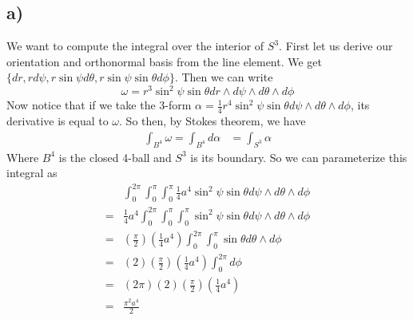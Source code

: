 \documentclass{article}
\theoremstyle{definition}
\begin{document}
\subsection*{a)}
We want to compute the integral over the interior of $S^3$. First let us derive our orientation and orthonormal basis from the 
line element. We get $\{dr, r d\psi, r\sin\psi d\theta, r \sin\psi \sin\theta d\phi\}$. Then we can write 
\[
\omega = r^3\sin^2\psi\sin\theta dr \wedge d\psi \wedge d\theta \wedge d\phi
    \]
Now notice that if we take the 3-form $\alpha = \frac{1}{4}r^4 \sin^2 \psi \sin \theta d\psi \wedge d\theta \wedge d\phi$,
its derivative is equal to $\omega$. So then, by Stokes theorem, we have 
\begin{align*}
    \int_{B^4} \omega = \int_{B^4}d\alpha &= \int_{S^3} \alpha
\end{align*}
Where $B^4$ is the closed 4-ball and $S^3$ is its boundary. So we can parameterize this integral as 
\begin{align*}
    & \int_0^{2\pi} \int_0^\pi \int_0^\pi \frac{1}{4}a^4 \sin^2 \psi \sin \theta d\psi \wedge d\theta \wedge d\phi \\
    =& \frac{1}{4}a^4 \int_0^{2\pi} \int_0^\pi \int_0^\pi \sin^2 \psi \sin \theta d\psi \wedge d\theta \wedge d\phi \\
    =& \left(\frac{\pi}{2}\right)\left(\frac{1}{4}a^4\right) \int_0^{2\pi} \int_0^\pi \sin \theta d\theta \wedge d\phi \\
    =& (2)\left(\frac{\pi}{2}\right)\left(\frac{1}{4}a^4\right) \int_0^{2\pi} d\phi \\
    =& (2\pi)(2)\left(\frac{\pi}{2}\right)\left(\frac{1}{4}a^4\right) \\
    =& \frac{\pi^2 a^4}{2}
\end{align*}
\end{document}
